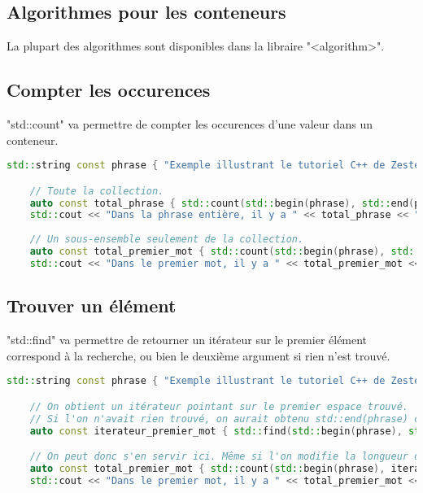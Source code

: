 \documentclass{article}
\begin{document}
\subsection{Algorithmes pour les conteneurs}
La plupart des algorithmes sont disponibles dans la libraire "<algorithm>".
\subsection{Compter les occurences}
"std::count" va permettre de compter les occurences d'une valeur dans un conteneur.

\begin{lstlisting}[language=C++]
    std::string const phrase { "Exemple illustrant le tutoriel C++ de Zeste de Savoir." };

    // Toute la collection.
    auto const total_phrase { std::count(std::begin(phrase), std::end(phrase), 'e') };
    std::cout << "Dans la phrase entière, il y a " << total_phrase << " 'e' minuscule." << std::endl;
    
    // Un sous-ensemble seulement de la collection.
    auto const total_premier_mot { std::count(std::begin(phrase), std::begin(phrase) + 7, 'e') };
    std::cout << "Dans le premier mot, il y a " << total_premier_mot << " 'e' minuscule." << std::endl;
\end{lstlisting}

\subsection{Trouver un élément}
"std::find" va permettre de retourner un itérateur sur le premier élément correspond à la recherche, ou bien le deuxième argument si rien n'est trouvé.

\begin{lstlisting}[language=C++]
    std::string const phrase { "Exemple illustrant le tutoriel C++ de Zeste de Savoir." };

    // On obtient un itérateur pointant sur le premier espace trouvé.
    // Si l'on n'avait rien trouvé, on aurait obtenu std::end(phrase) comme valeur de retour.
    auto const iterateur_premier_mot { std::find(std::begin(phrase), std::end(phrase), ' ') };

    // On peut donc s'en servir ici. Même si l'on modifie la longueur du premier mot, on est assuré que cette solution marche.
    auto const total_premier_mot { std::count(std::begin(phrase), iterateur_premier_mot, 'e') };
    std::cout << "Dans le premier mot, il y a " << total_premier_mot << " 'e' minuscule." << std::endl;    
\end{lstlisting}
\end{document}
